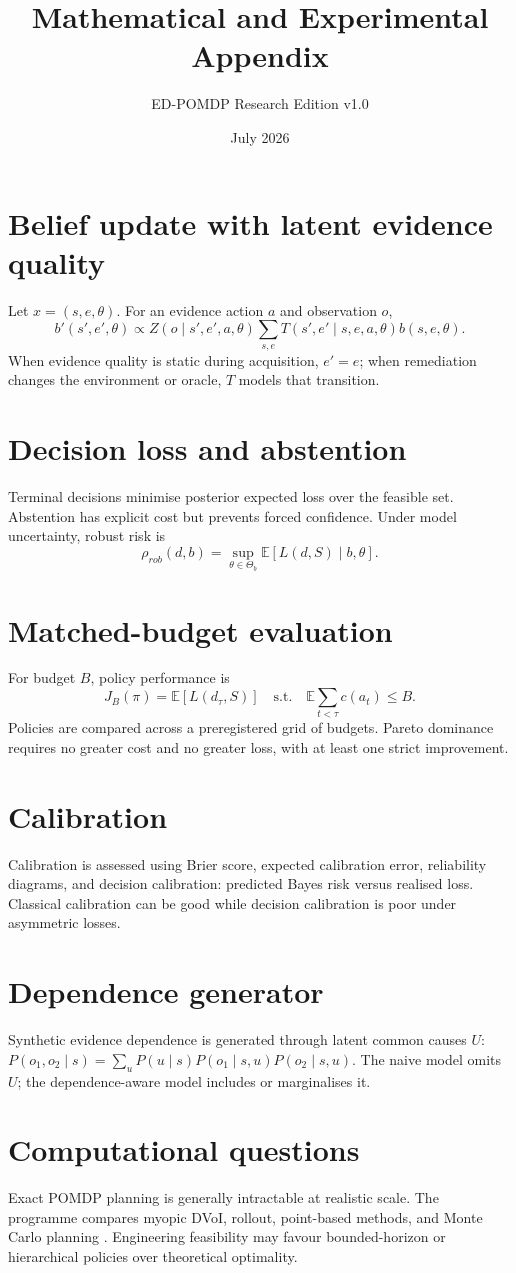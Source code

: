 \documentclass[11pt]{article}
\title{Mathematical and Experimental Appendix}
\author{ED-POMDP Research Edition v1.0}
\date{July 2026}
\begin{document}
\maketitle
\section{Belief update with latent evidence quality}
Let $x=(s,e,\theta)$. For an evidence action $a$ and observation $o$,
\[
b'(s',e',\theta)\propto Z(o\mid s',e',a,\theta)\sum_{s,e}T(s',e'\mid s,e,a,\theta)b(s,e,\theta).
\]
When evidence quality is static during acquisition, $e'=e$; when remediation changes the environment or oracle, $T$ models that transition.
\section{Decision loss and abstention}
Terminal decisions minimise posterior expected loss over the feasible set. Abstention has explicit cost but prevents forced confidence. Under model uncertainty, robust risk is
\[
\rho_{rob}(d,b)=\sup_{\theta\in\Theta_b}\mathbb{E}[L(d,S)\mid b,\theta].
\]
\section{Matched-budget evaluation}
For budget $B$, policy performance is
\[
J_B(\pi)=\mathbb{E}[L(d_\tau,S)]\quad\text{s.t.}\quad \mathbb{E}\sum_{t<\tau}c(a_t)\le B.
\]
Policies are compared across a preregistered grid of budgets. Pareto dominance requires no greater cost and no greater loss, with at least one strict improvement.
\section{Calibration}
Calibration is assessed using Brier score, expected calibration error, reliability diagrams, and decision calibration: predicted Bayes risk versus realised loss. Classical calibration can be good while decision calibration is poor under asymmetric losses.
\section{Dependence generator}
Synthetic evidence dependence is generated through latent common causes $U$: $P(o_1,o_2\mid s)=\sum_uP(u\mid s)P(o_1\mid s,u)P(o_2\mid s,u)$. The naive model omits $U$; the dependence-aware model includes or marginalises it.
\section{Computational questions}
Exact POMDP planning is generally intractable at realistic scale. The programme compares myopic DVoI, rollout, point-based methods, and Monte Carlo planning \cite{silver2010pomcp}. Engineering feasibility may favour bounded-horizon or hierarchical policies over theoretical optimality.
\end{document}
